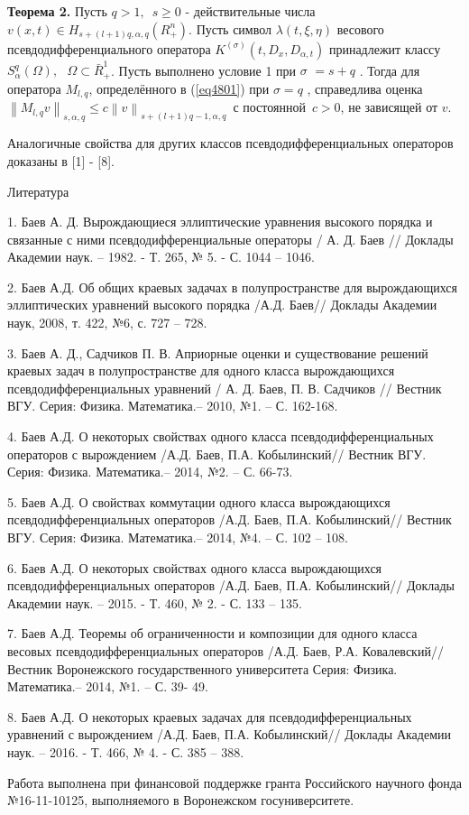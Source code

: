{\textbf{Теорема 2.} Пусть $q > 1,\,\,\,s \geqslant 0$ - действительные числа
$v(x,t) \in H_{s + (l + 1)q,\alpha ,q} (R_ + ^n )$. Пусть символ $\lambda
(t,\xi ,\eta )$ весового псевдодифференциального оператора $K^{(\sigma
)}(t,D_x ,D_{\alpha ,t} )$ принадлежит классу $S_\alpha ^q (\Omega
),\,\,\,\,\Omega \subset \bar {R}_ + ^1 $. Пусть выполнено условие 1 при
$\sigma \,\, = s + q\,\,$. Тогда для оператора $M_{l,q} $, определённого в
(\ref{eq4801}) при $\sigma = q\,\,$, справедлива оценка $\left\| {M_{l,q} v}
\right\|_{s,\alpha ,q} \leqslant c\left\| v \right\|_{s + (l + 1)q - 1,\alpha ,q}
\,$
с постоянной $\,c > 0$, не зависящей от $v$.



Аналогичные свойства для других классов псевдодифференциальных операторов
доказаны в [1] - [8].

\begin{center}
Литература
\end{center}

1. Баев А. Д. Вырождающиеся эллиптические уравнения высокого порядка и
связанные с ними псевдодифференциальные операторы / А. Д. Баев // Доклады
Академии наук. -- 1982. - Т. 265, № 5. - С. 1044 -- 1046.

2. Баев А.Д. Об общих краевых задачах в полупространстве для вырождающихся
эллиптических уравнений высокого порядка /А.Д. Баев// Доклады Академии наук,
2008, т. 422, №6, с. 727 -- 728.

3. Баев А. Д., Садчиков П. В. Априорные оценки и существование решений
краевых задач в полупространстве для одного класса вырождающихся
псевдодифференциальных уравнений / А. Д. Баев, П. В. Садчиков // Вестник
ВГУ. Серия: Физика. Математика.-- 2010, №1. -- С. 162-168.

4. Баев А.Д. О некоторых свойствах одного класса псевдодифференциальных
операторов с вырождением /А.Д. Баев, П.А. Кобылинский// Вестник ВГУ. Серия:
Физика. Математика.-- 2014, №2. -- С. 66-73.

5. Баев А.Д. О свойствах коммутации одного класса вырождающихся
псевдодифференциальных операторов /А.Д. Баев, П.А. Кобылинский// Вестник
ВГУ. Серия: Физика. Математика.-- 2014, №4. -- С. 102 -- 108.

6. Баев А.Д. О некоторых свойствах одного класса вырождающихся
псевдодифференциальных операторов /А.Д. Баев, П.А. Кобылинский// Доклады
Академии наук. -- 2015. - Т. 460, № 2. - С. 133 -- 135.

7. Баев А.Д. Теоремы об ограниченности и композиции для одного класса
весовых псевдодифференциальных операторов /А.Д. Баев, Р.А. Ковалевский//
Вестник Воронежского государственного университета Серия: Физика.
Математика.-- 2014, №1. -- С. 39- 49.

8. Баев А.Д. О некоторых краевых задачах для псевдодифференциальных
уравнений с вырождением /А.Д. Баев, П.А. Кобылинский// Доклады Академии
наук. -- 2016. - Т. 466, № 4. - С. 385 -- 388.





Работа выполнена при финансовой поддержке гранта Российского научного фонда
№16-11-10125, выполняемого в Воронежском госуниверситете.

}
